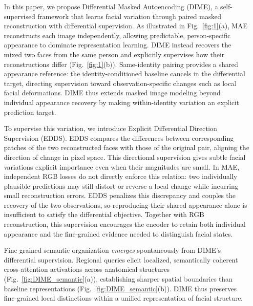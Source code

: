 \documentclass[10pt,journal,compsoc]{IEEEtran}
\begin{document}
In this paper, we propose Differential Masked Autoencoding (DIME), a self-supervised framework that learns facial variation through paired masked reconstruction with differential supervision. As illustrated in Fig.~\ref{fig:1}(a), MAE reconstructs each image independently, allowing predictable, person-specific appearance to dominate representation learning. DIME instead recovers the mixed two faces from the same person and explicitly supervises how their reconstructions differ (Fig.~\ref{fig:1}(b)). Same-identity pairing provides a shared appearance reference: the identity-conditioned baseline cancels in the differential target, directing supervision toward observation-specific changes such as local facial deformations. DIME thus extends masked image modeling beyond individual appearance recovery by making within-identity variation an explicit prediction target.

To supervise this variation, we introduce Explicit Differential Direction Supervision (EDDS). EDDS compares the differences between corresponding patches of the two reconstructed faces with those of the original pair, aligning the direction of change in pixel space. This directional supervision gives subtle facial variations explicit importance even when their magnitudes are small. In MAE, independent RGB losses do not directly enforce this relation: two individually plausible predictions may still distort or reverse a local change while incurring small reconstruction errors. EDDS penalizes this discrepancy and couples the recovery of the two observations, so reproducing their shared appearance alone is insufficient to satisfy the differential objective. Together with RGB reconstruction, this supervision encourages the encoder to retain both individual appearance and the fine-grained evidence needed to distinguish facial states.



Fine-grained semantic organization \textit{emerges} spontaneously from DIME's differential supervision. Regional queries elicit localized, semantically coherent cross-attention activations across anatomical structures (Fig.~\ref{fig:DIME_semantic}(a)), establishing sharper spatial boundaries than baseline representations (Fig.~\ref{fig:DIME_semantic}(b)). DIME thus preserves fine-grained local distinctions within a unified representation of facial structure.
\end{document}
